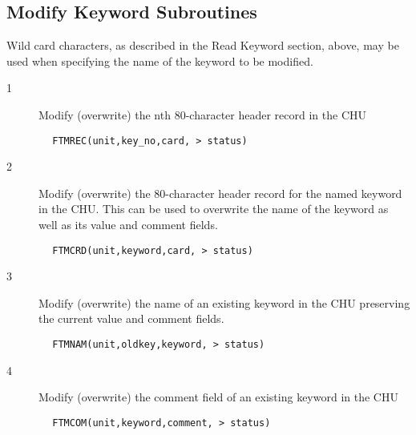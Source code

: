 \documentclass[11pt]{book}
\begin{document}
\subsection{Modify Keyword Subroutines \label{FTMREC}}

Wild card characters, as described in the Read Keyword section, above,
may be used when specifying the name of the keyword to be modified.


\begin{description}
\item[1 ] Modify (overwrite) the nth 80-character header record in the CHU
\end{description}

\begin{verbatim}
        FTMREC(unit,key_no,card, > status)
\end{verbatim}

\begin{description}
\item[2 ] Modify (overwrite) the 80-character header record for the named keyword
    in the CHU.  This can be used to overwrite the name of the keyword as
   well as its value and comment fields.
\end{description}

\begin{verbatim}
        FTMCRD(unit,keyword,card, > status)
\end{verbatim}

\begin{description}
\item[3 ] Modify (overwrite) the name of an existing keyword in the CHU
   preserving the current value and comment fields.
\end{description}

\begin{verbatim}
        FTMNAM(unit,oldkey,keyword, > status)
\end{verbatim}

\begin{description}
\item[4 ] Modify (overwrite) the comment field of an existing keyword in the CHU
\end{description}

\begin{verbatim}
        FTMCOM(unit,keyword,comment, > status)
\end{verbatim}
\end{document}

